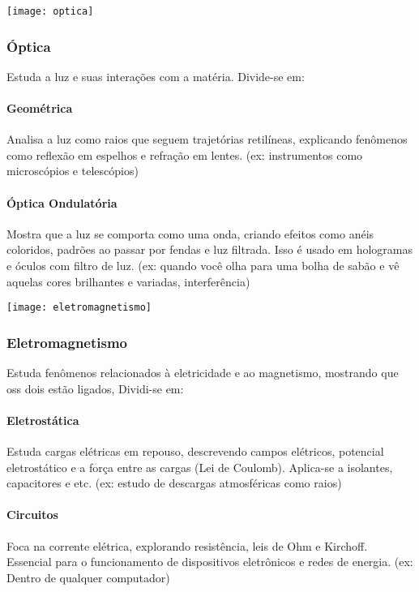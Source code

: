 \documentclass[portuguese,11pt,a4paper,oneside,openany,notitlepage]{article}
\begin{document}
	\begin{center}
		\texttt{[image: optica]}
	\end{center}
	
	\subsubsection{Óptica}
	Estuda a luz e suas interações com a matéria. Divide-se em:
	\paragraph{Geométrica}
	Analisa a luz como raios que seguem trajetórias retilíneas, explicando fenômenos como reflexão em espelhos e refração em lentes. \newline (ex: instrumentos como microscópios e telescópios)
	\paragraph{Óptica Ondulatória}
	Mostra que a luz se comporta como uma onda, criando efeitos como anéis coloridos, padrões ao passar por fendas e luz filtrada. Isso é usado em hologramas e óculos com filtro de luz. \newline (ex: quando você olha para uma bolha de sabão e vê aquelas cores brilhantes e variadas, interferência)
	
	\begin{center}
		\texttt{[image: eletromagnetismo]}
	\end{center}
	
	\subsubsection{Eletromagnetismo}
	Estuda fenômenos relacionados à eletricidade e ao magnetismo, mostrando que oss dois estão ligados, Dividi-se em:
	\paragraph{Eletrostática}
	Estuda cargas elétricas em repouso, descrevendo campos elétricos, potencial eletrostático e a força entre as cargas (Lei de Coulomb). Aplica-se a isolantes, capacitores e etc. \newline (ex: estudo de descargas atmosféricas como raios)
	\paragraph{Circuitos}
	Foca na corrente elétrica, explorando resistência, leis de Ohm e Kirchoff. Essencial para o funcionamento de dispositivos eletrônicos e redes de energia. \newline (ex: Dentro de qualquer computador) 
\end{document}
